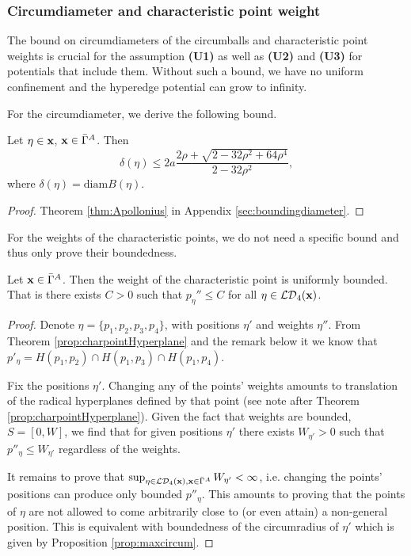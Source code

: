 \subsubsection{Circumdiameter and characteristic point weight}
The bound on circumdiameters of the circumballs and characteristic point weights is crucial for the assumption \textbf{(U1)} as well as \textbf{(U2)} and \textbf{(U3)} for potentials that include them. Without such a bound, we have no uniform confinement and the hyperedge potential can grow to infinity.\newline 

\noindent For the circumdiameter, we derive the following bound.
\begin{proposition}\label{prop:maxcircum}
	Let $\eta \in {\mathbf{x}}$, ${\mathbf{x}} \in \bar\Gamma^A$. Then 
	$$\delta(\eta) \leq  2a \frac{2\rho + \sqrt{2 - 32\rho^2 + 64 \rho^4}}{2-32\rho^2},$$
	where $\delta(\eta) = \mathrm{diam}B(\eta)$.
\end{proposition}
\begin{proof}
	Theorem \ref{thm:Apollonius} in Appendix \ref{sec:boundingdiameter}.
\end{proof}

\noindent For the weights of the characteristic points, we do not need a specific bound and thus only prove their boundedness.
\begin{proposition}\label{prop:maxPeta}
	Let ${\mathbf{x}} \in \bar\Gamma^A$. Then the weight of the characteristic point is uniformly bounded. That is there exists $C>0$ such that $p_\eta'' \leq C$ for all $\eta \in \mathcal {LD}_4({\mathbf{x}})$. 
\end{proposition}
\begin{proof}
Denote $\eta=\{p_1,p_2,p_3,p_4\}$, with positions $\eta'$ and weights $\eta''$. From Theorem \ref{prop:charpointHyperplane} and the remark below it we know that $p'_\eta = H(p_1,p_2)\cap H(p_1,p_3) \cap H(p_1,p_4)$.

Fix the positions $\eta'$.  Changing any of the points' weights amounts to translation of the radical hyperplanes defined by that point (see note after Theorem \ref{prop:charpointHyperplane}). Given the fact that weights are bounded, $S=[0,W]$, we find that for given positions $\eta'$ there exists $W_{\eta'}>0$ such that $p''_\eta \leq W_{\eta'}$ regardless of the weights.

It remains to prove that $\sup_{\eta \in \mathcal {LD}_4({\mathbf{x}}),{\mathbf{x}} \in \bar\Gamma^A} W_{\eta'} < \infty$, i.e. changing the points' positions can produce only bounded $p''_\eta$. This amounts to proving that the points of $\eta$ are not allowed to come arbitrarily close to (or even attain) a non-general position. This is equivalent with boundedness of the circumradius of $\eta'$ which is given by Proposition \ref{prop:maxcircum}.
\end{proof}


